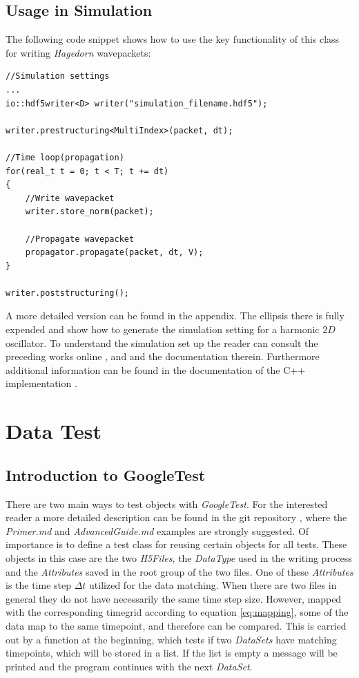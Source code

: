 \section{Usage in Simulation}
The following code snippet shows how to use the key functionality of this class for writing \textit{Hagedorn} wavepackets:

\begin{lstlisting}
//Simulation settings
...
io::hdf5writer<D> writer("simulation_filename.hdf5");

writer.prestructuring<MultiIndex>(packet, dt);

//Time loop(propagation)
for(real_t t = 0; t < T; t += dt)
{
	//Write wavepacket
	writer.store_norm(packet);
	
	//Propagate wavepacket
   	propagator.propagate(packet, dt, V);
}

writer.poststructuring();
\end{lstlisting}
A more detailed version can be found in the appendix. The ellipsis there is fully expended and show how to generate the simulation setting for a harmonic $2D$ oscillator. To understand the simulation set up the reader can consult the preceding works online \cite{bt_michajab}, \cite{st_benedekv} and \cite{bt_lionelm} and the documentation therein. Furthermore additional information can be found in the documentation of the C++ implementation \cite{libwaveblocks}.

\chapter{Data Test}
\label{chapt:datatest}

\section{Introduction to GoogleTest}
There are two main ways to test objects with \textit{GoogleTest}. For the interested reader a more detailed description can be found in the git repository \cite{googletestdoc}, where the \emph{Primer.md} and \emph{AdvancedGuide.md} examples are strongly suggested. Of importance is to define a test class for reusing certain objects for all tests. These objects in this case are the two \textit{H5Files}, the \textit{DataType} used in the writing process and the \textit{Attributes} saved in the root group of the two files. One of these \textit{Attributes} is the time step $\Delta t$ utilized for the data matching. When there are two files in general they do not have necessarily the same time step size. However, mapped with the corresponding timegrid according to equation \ref{eq:mapping}, some of the data map to the same timepoint, and therefore can be compared. This is carried out by a function at the beginning, which tests if two \textit{DataSets} have matching timepoints, which will be stored in a list. If the list is empty a message will be printed and the program continues with the next \textit{DataSet}.

